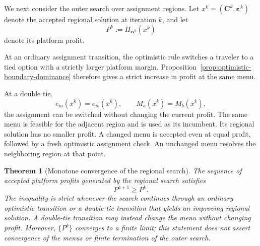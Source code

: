 \documentclass{article}
\newtheorem{theorem}{Theorem}
\begin{document}
We next consider the outer search over assignment regions. Let
$x^k=(\bm C^k,\bm\varepsilon^k)$ denote the accepted regional solution
at iteration $k$, and let
\begin{equation}
    P^k
    :=
    \Pi_{\bm\alpha^k}(x^k)
\end{equation}
denote its platform profit.

At an ordinary assignment transition, the optimistic rule switches a
traveler to a tied option with a strictly larger platform margin.
Proposition~\ref{prop:optimistic-boundary-dominance} therefore gives a
strict increase in profit at the same menu.

At a double tie,
\begin{equation}
    e_{ia}(x^k)=e_{ib}(x^k),
    \qquad
    M_a(x^k)=M_b(x^k),
    \label{eq:double-tie}
\end{equation}
the assignment can be switched without changing the current profit.
The same menu is feasible for the adjacent region and is used as its
incumbent. Its regional solution has no smaller profit. A changed menu is
accepted even at equal profit, followed by a fresh optimistic assignment
check. An unchanged menu resolves the neighboring region at that point.

\begin{theorem}[Monotone convergence of the regional search]
The sequence of accepted platform profits generated by the regional
search satisfies
\begin{equation}
    P^{k+1}\geq P^k.
\end{equation}
The inequality is strict whenever the search continues through an
ordinary optimistic transition or a double-tie transition that yields
an improving regional solution. A double-tie transition may instead
change the menu without changing profit. Moreover, $\{P^k\}$ converges
to a finite limit; this statement does not assert convergence of the
menus or finite termination of the outer search.
\label{thm:outer-convergence}
\end{theorem}
\end{document}
